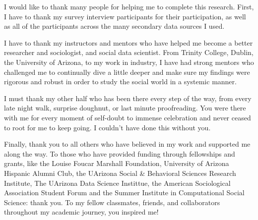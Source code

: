 
I would like to thank many people for helping me to complete this research. First, I have to
thank my survey interview participants for their participation, as well as all of the participants
across the many secondary data sources I used. 

I have to thank my instructors and mentors who have helped me become a better researcher and
sociologist, and social data scientist. From Trinity College, Dublin, the University of Arizona, 
to my work in industry, I have had strong mentors who challenged me to continually
dive a little deeper and make sure my findings were rigorous and robust 
in order to study the social world in a systemic manner. 

I must thank my other half who has been there every step of the way, from every late night walk, 
surprise doughnut, or last minute proofreading. You were there with me for every moment of
self-doubt to immense celebration and never ceased to root for me to keep going. 
I couldn't have done this without you.

Finally, thank you to all others who have believed in my work and supported me along the way. 
To those who have provided funding through fellowships and grants, like the Louise Foucar Marshall 
Foundation, University of Arizona Hispanic Alumni Club, the UArizona Social \& Behavioral Sciences Research
Institute, The UArizona Data Science Instittue, the American Sociological Association Student Forum and the
Summer Institute in Computational Social Science: thank you. To my fellow classmates, friends, and 
collaborators throughout my academic journey, you inspired me! 






